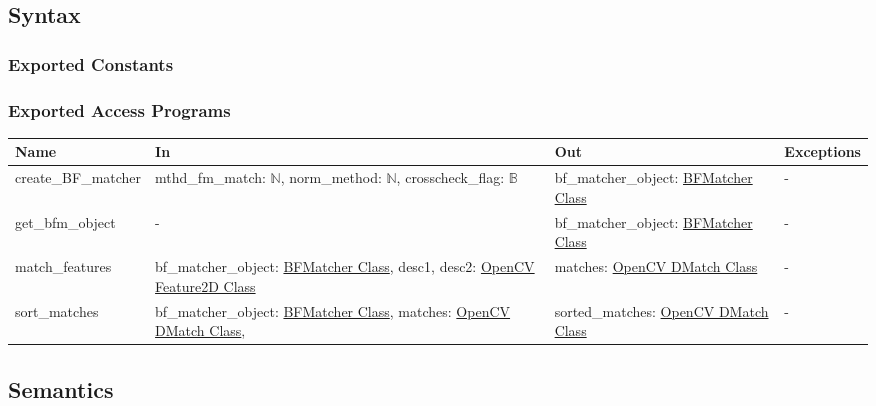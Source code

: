\documentclass[12pt, titlepage]{article}
\begin{document}
\subsection{Syntax}

\subsubsection{Exported Constants}

\subsubsection{Exported Access Programs}

\begin{center}
\begin{tabular}{p{3.5cm} p{4cm} p{3.5cm} p{2.5cm}}
\hline
\textbf{Name} & \textbf{In} & \textbf{Out} & \textbf{Exceptions} \\
\hline
create\_BF\_matcher 
& mthd\_fm\_match: $\mathbb{N}$, \newline
norm\_method: $\mathbb{N}$, \newline
crosscheck\_flag: $\mathbb{B}$ 
& bf\_matcher\_object: \href{https://docs.opencv.org/3.4/d3/da1/classcv_1_1BFMatcher.html}{BFMatcher Class} 
& - \\
\hline
get\_bfm\_object 
& -
& bf\_matcher\_object: \href{https://docs.opencv.org/3.4/d3/da1/classcv_1_1BFMatcher.html}{BFMatcher Class} 
& - \\
\hline
match\_features 
& bf\_matcher\_object: \href{https://docs.opencv.org/3.4/d3/da1/classcv_1_1BFMatcher.html}{BFMatcher Class}, \newline
desc1, desc2: \href{https://docs.opencv.org/4.x/d0/d13/classcv_1_1Feature2D.html}{OpenCV Feature2D Class}
& matches: \href{https://docs.opencv.org/3.4/d4/de0/classcv_1_1DMatch.html}{OpenCV DMatch Class} 
& - \\
\hline
sort\_matches & bf\_matcher\_object: \href{https://docs.opencv.org/3.4/d3/da1/classcv_1_1BFMatcher.html}{BFMatcher Class}, \newline 
matches: \href{https://docs.opencv.org/3.4/d4/de0/classcv_1_1DMatch.html}{OpenCV DMatch Class}, \newline 
& sorted\_matches: \href{https://docs.opencv.org/3.4/d4/de0/classcv_1_1DMatch.html}{OpenCV DMatch Class}
& - \\
\hline
\end{tabular}
\end{center}

\subsection{Semantics}
\end{document}
